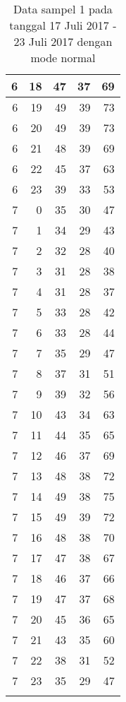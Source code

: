 \begin{longtable}{|r|r|r|r|r|}
    \hline
    6     & 18    & 47    & 37    & 69 \\
    \hline
    6     & 19    & 49    & 39    & 73 \\
    \hline
    6     & 20    & 49    & 39    & 73 \\
    \hline
    6     & 21    & 48    & 39    & 69 \\
    \hline
    6     & 22    & 45    & 37    & 63 \\
    \hline
    6     & 23    & 39    & 33    & 53 \\
    \hline
    7     & 0     & 35    & 30    & 47 \\
    \hline
    7     & 1     & 34    & 29    & 43 \\
    \hline
    7     & 2     & 32    & 28    & 40 \\
    \hline
    7     & 3     & 31    & 28    & 38 \\
    \hline
    7     & 4     & 31    & 28    & 37 \\
    \hline
    7     & 5     & 33    & 28    & 42 \\
    \hline
    7     & 6     & 33    & 28    & 44 \\
    \hline
    7     & 7     & 35    & 29    & 47 \\
    \hline
    7     & 8     & 37    & 31    & 51 \\
    \hline
    7     & 9     & 39    & 32    & 56 \\
    \hline
    7     & 10    & 43    & 34    & 63 \\
    \hline
    7     & 11    & 44    & 35    & 65 \\
    \hline
    7     & 12    & 46    & 37    & 69 \\
    \hline
    7     & 13    & 48    & 38    & 72 \\
    \hline
    7     & 14    & 49    & 38    & 75 \\
    \hline
    7     & 15    & 49    & 39    & 72 \\
    \hline
    7     & 16    & 48    & 38    & 70 \\
    \hline
    7     & 17    & 47    & 38    & 67 \\
    \hline
    7     & 18    & 46    & 37    & 66 \\
    \hline
    7     & 19    & 47    & 37    & 68 \\
    \hline
    7     & 20    & 45    & 36    & 65 \\
    \hline
    7     & 21    & 43    & 35    & 60 \\
    \hline
    7     & 22    & 38    & 31    & 52 \\
    \hline
    7     & 23    & 35    & 29    & 47 \\
    \hline
	\caption{Data sampel 1 pada tanggal 17 Juli 2017 - 23 Juli 2017 dengan mode normal}
  \label{tab:datasample117072017normal}%
\end{longtable}%


